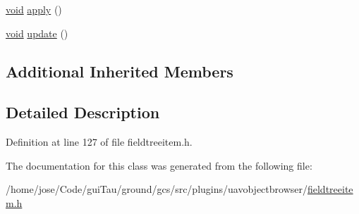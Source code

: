 \begin{DoxyCompactItemize}
\item 
\hyperlink{group___u_a_v_objects_plugin_ga444cf2ff3f0ecbe028adce838d373f5c}{void} \hyperlink{group___u_a_v_object_browser_plugin_ga24ca9e240126f614a138454ca00bd6b1}{apply} ()
\item 
\hyperlink{group___u_a_v_objects_plugin_ga444cf2ff3f0ecbe028adce838d373f5c}{void} \hyperlink{group___u_a_v_object_browser_plugin_ga8d58b6ded0f3e8c6d46cd4de99d0f061}{update} ()
\end{DoxyCompactItemize}
\subsection*{Additional Inherited Members}


\subsection{Detailed Description}


Definition at line 127 of file fieldtreeitem.\-h.



The documentation for this class was generated from the following file\-:\begin{DoxyCompactItemize}
\item 
/home/jose/\-Code/gui\-Tau/ground/gcs/src/plugins/uavobjectbrowser/\hyperlink{fieldtreeitem_8h}{fieldtreeitem.\-h}\end{DoxyCompactItemize}
